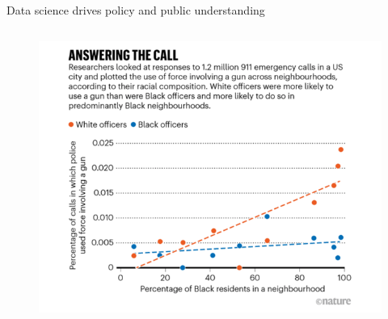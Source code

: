 \documentclass[aspectratio=169]{../latex_main/tntbeamer}  %
\begin{document}
\begin{frame}{Data science drives policy and public understanding}
\begin{columns}
            \begin{column}{.3\textwidth}
                    \begin{figure}
                        \centering
                        \includegraphics[scale=.5]{bild10}
                    \end{figure}
            \end{column}
        \end{columns}
    \end{frame}
\end{document}
